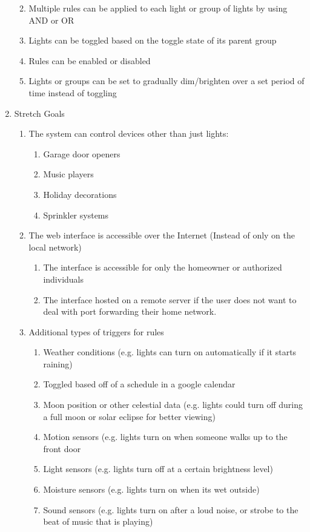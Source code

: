 \documentclass[oneside,openright]{book}
\begin{document}
\begin{enumerate}
\begin{enumerate}
\begin{enumerate}
\end{enumerate}
\item Multiple rules can be applied to each light or group of lights by using AND or OR
\item Lights can be toggled based on the toggle state of its parent group
\item Rules can be enabled or disabled
\item Lights or groups can be set to gradually dim/brighten over a set period of time instead of toggling
\end{enumerate}
\item Stretch Goals
\begin{enumerate}
\item The system can control devices other than just lights:
\begin{enumerate}
\item Garage door openers
\item Music players
\item Holiday decorations
\item Sprinkler systems
\end{enumerate}
\item The web interface is accessible over the Internet (Instead of only on the local network)
\begin{enumerate}
\item The interface is accessible for only the homeowner or authorized individuals
\item The interface hosted on a remote server if the user does not want to deal with port forwarding their home network.
\end{enumerate}
\item Additional types of triggers for rules
\begin{enumerate}
\item Weather conditions (e.g. lights can turn on automatically if it starts raining)
\item Toggled based off of a schedule in a google calendar
\item Moon position or other celestial data (e.g. lights could turn off during a full moon or solar eclipse for better viewing)
\item Motion sensors (e.g. lights turn on when someone walks up to the front door
\item Light sensors (e.g. lights turn off at a certain brightness level)
\item Moisture sensors (e.g. lights turn on when its wet outside)
\item Sound sensors (e.g. lights turn on after a loud noise, or strobe to the beat of music that is playing)
\end{enumerate}
\end{enumerate}
\end{enumerate}
\end{document}
